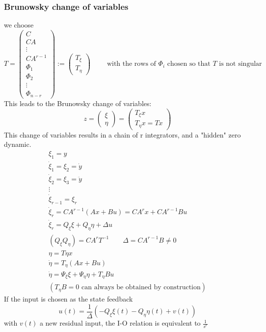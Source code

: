\documentclass[english]{lectures}
\begin{document}
\subsubsection{Brunowsky change of variables}
we choose
\[
T=\begin{pmatrix}
    C\\CA\\ \vdots \\CA^{r-1}\\ \Phi_1 \\ \Phi_2 \\ \vdots \\ \Phi_{n-r}
\end{pmatrix} := \begin{pmatrix}
    T_{\xi} \\ T_{\eta}
\end{pmatrix} \qquad \text{ with the rows of } \Phi_i \text{ chosen so that } T \text{ is not singular}
\]
This leads to the Brunowsky change of variables:
\[
z=\begin{pmatrix}
    \xi \\ \eta
\end{pmatrix} = \begin{pmatrix}
    T_{\xi}x \\ T_{\eta}x = Tx
\end{pmatrix}
\]
This change of variables results in a chain of r integrators, and a "hidden" zero dynamic.
\begin{gather*}
    \xi_1=y \\
    \dot{\xi}_1 = \xi_2 = \dot{y}\\
    \dot{\xi}_2=\xi_3 = \ddot{y}\\
    \vdots \\
    \dot{\xi}_{r-1} = \xi_r\\
    \dot{\xi}_r = CA^{r-1}(Ax+Bu)=CA^rx+CA^{r-1}Bu\\
    \dot{\xi}_r = Q_{\xi} \xi + Q_{\eta}\eta + \Delta u\\
    (Q_{\xi} Q_{\eta}) = CA^rT^{-1} \qquad \Delta = CA^{r-1}B \neq 0
    \\
    \eta = T{\eta} x\\
    \dot{\eta} =T_{\eta}(Ax+Bu)\\
    \dot{\eta} = \Psi_{\xi} \xi + \Psi_{\eta} \eta + T_{\eta}Bu \\ (T_{\eta}B=0 \text{ can always be obtained by construction})
\end{gather*}
If the input is chosen as the state feedback
\[
u(t)=\frac{1}{\Delta}(-Q_{\xi}\xi(t)-Q_{\eta}\eta(t)+v(t))
\]
with $v(t)$ a new residual input, the I-O relation is equivalent to $\frac{1}{s^r}$
\end{document}
